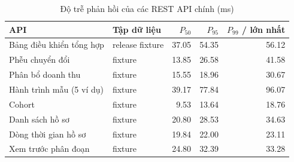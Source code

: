 \begin{table}[H]
\centering
\caption{Độ trễ phản hồi của các REST API chính (ms)}
\label{tab:api-latency}
\small
\renewcommand{\arraystretch}{1.15}
\begin{tabular}{llrrr}
\toprule
\textbf{API} & \textbf{Tập dữ liệu} & $P_{50}$ & $P_{95}$ & $P_{99}$ / lớn nhất \\
\midrule
Bảng điều khiển tổng hợp & release fixture & \num{37.05} & \num{54.35} & \num{56.12} \\
Phễu chuyển đổi & fixture & \num{13.85} & \num{26.58} & \num{41.58} \\
Phân bổ doanh thu & fixture & \num{15.55} & \num{18.96} & \num{30.67} \\
Hành trình mẫu (5 ví dụ) & fixture & \num{39.17} & \num{77.84} & \num{96.07} \\
Cohort & fixture & \num{9.53} & \num{13.64} & \num{18.76} \\
Danh sách hồ sơ & fixture & \num{20.80} & \num{28.53} & \num{34.63} \\
Dòng thời gian hồ sơ & fixture & \num{19.84} & \num{22.00} & \num{23.11} \\
Xem trước phân đoạn & fixture & \num{24.80} & \num{32.39} & \num{33.28} \\
\bottomrule
\end{tabular}
\end{table}
